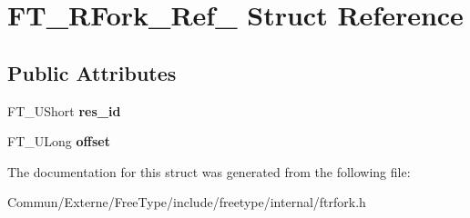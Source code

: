 \hypertarget{struct_f_t___r_fork___ref__}{}\section{F\+T\+\_\+\+R\+Fork\+\_\+\+Ref\+\_\+ Struct Reference}
\label{struct_f_t___r_fork___ref__}
\subsection*{Public Attributes}
\begin{DoxyCompactItemize}
\item 
F\+T\+\_\+\+U\+Short {\bfseries res\+\_\+id}\hypertarget{struct_f_t___r_fork___ref___a7bca14bddf56df7903166b52e19a0500}{}\label{struct_f_t___r_fork___ref___a7bca14bddf56df7903166b52e19a0500}

\item 
F\+T\+\_\+\+U\+Long {\bfseries offset}\hypertarget{struct_f_t___r_fork___ref___af84c349a29b40c42a788927b113f9ecf}{}\label{struct_f_t___r_fork___ref___af84c349a29b40c42a788927b113f9ecf}

\end{DoxyCompactItemize}


The documentation for this struct was generated from the following file\+:\begin{DoxyCompactItemize}
\item 
Commun/\+Externe/\+Free\+Type/include/freetype/internal/ftrfork.\+h\end{DoxyCompactItemize}
